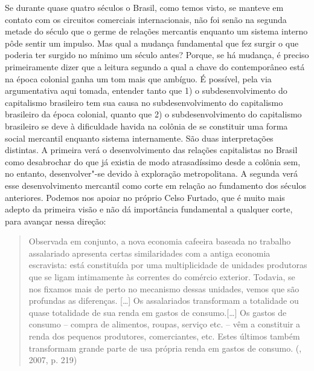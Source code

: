 Se durante quase quatro séculos o Brasil, como temos visto, se manteve
em contato com os circuitos comerciais internacionais, não foi senão na
segunda metade do século  que o germe de relações mercantis enquanto
um sistema interno pôde sentir um impulso. Mas qual a mudança
fundamental que fez surgir o que poderia ter surgido no mínimo um século
antes? Porque, se há mudança, é preciso primeiramente dizer que a
leitura segundo a qual a chave do contemporâneo está na época colonial
ganha um tom mais que ambíguo. É possível, pela via argumentativa aqui
tomada, entender tanto que 1) o subdesenvolvimento do capitalismo
brasileiro tem sua causa no subdesenvolvimento do capitalismo brasileiro
da época colonial, quanto que 2) o subdesenvolvimento do capitalismo
brasileiro se deve à dificuldade havida na colônia de se constituir uma
forma social mercantil enquanto sistema internamente. São duas
interpretações distintas. A primeira verá o desenvolvimento das relações
capitalistas no Brasil como desabrochar do que já existia de modo
atrasadíssimo desde a colônia sem, no entanto, desenvolver"-se devido à
exploração metropolitana. A segunda verá esse desenvolvimento mercantil
como corte em relação ao fundamento dos séculos anteriores. Podemos nos
apoiar no próprio Celso Furtado, que é muito mais adepto da primeira visão e
não dá importância fundamental a qualquer corte, para avançar nessa
direção:

\begin{quote}
Observada em conjunto, a nova economia cafeeira baseada no trabalho
assalariado apresenta certas similaridades com a antiga economia
escravista: está constituída por uma multiplicidade de unidades
produtoras que se ligam intimamente às correntes do comércio exterior.
Todavia, se nos fixamos mais de perto no mecanismo dessas unidades,
vemos que são profundas as diferenças. [\ldots{}] Os assalariados
transformam a totalidade ou quase totalidade de sua renda em gastos de
consumo.[\ldots{}] Os gastos de consumo -- compra de alimentos, roupas,
serviço etc. -- vêm a constituir a renda dos pequenos produtores,
comerciantes, etc. Estes últimos também transformam grande parte de usa
própria renda em gastos de consumo. (, 2007, p. 219)
\end{quote}

